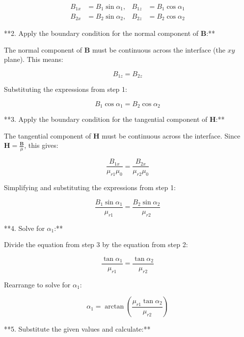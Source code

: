 \documentclass{article}
\begin{document}
\begin{align*}
B_{1x} &= B_1 \sin \alpha_1, & B_{1z} &= B_1 \cos \alpha_1 \\
B_{2x} &= B_2 \sin \alpha_2, & B_{2z} &= B_2 \cos \alpha_2
\end{align*}

**2. Apply the boundary condition for the normal component of $\mathbf{B}$:**

The normal component of $\mathbf{B}$ must be continuous across the interface (the $xy$ plane). This means:

\begin{equation*}
B_{1z} = B_{2z}
\end{equation*}

Substituting the expressions from step 1:

\begin{equation*}
B_1 \cos \alpha_1 = B_2 \cos \alpha_2
\end{equation*}

**3. Apply the boundary condition for the tangential component of $\mathbf{H}$:**

The tangential component of $\mathbf{H}$ must be continuous across the interface. Since $\mathbf{H} = \frac{\mathbf{B}}{\mu}$, this gives:

\begin{equation*}
\frac{B_{1x}}{\mu_{r1} \mu_0} = \frac{B_{2x}}{\mu_{r2} \mu_0}
\end{equation*}

Simplifying and substituting the expressions from step 1:

\begin{equation*}
\frac{B_1 \sin \alpha_1}{\mu_{r1}} = \frac{B_2 \sin \alpha_2}{\mu_{r2}} 
\end{equation*}

**4. Solve for $\alpha_1$:**

Divide the equation from step 3 by the equation from step 2:

\begin{equation*}
\frac{\tan \alpha_1}{\mu_{r1}} = \frac{\tan \alpha_2}{\mu_{r2}}
\end{equation*}

Rearrange to solve for $\alpha_1$:

\begin{equation*}
\alpha_1 = \arctan \left( \frac{\mu_{r1} \tan \alpha_2}{\mu_{r2}} \right)
\end{equation*}

**5. Substitute the given values and calculate:**
\end{document}
